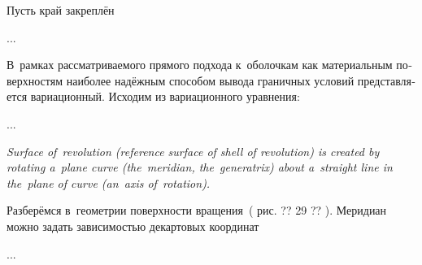 

\begin{otherlanguage}{russian}

Пусть край закреплён

...



\end{otherlanguage}



\begin{otherlanguage}{russian}

В~рамках рассматриваемого прямого подхода к~оболочкам как материальным поверхностям наиболее надёжным способом вывода граничных условий представляется вариационный. Исходим из вариационного уравнения:

...



\end{otherlanguage}



\noindent \emph{Surface of~revolution (reference surface of shell of revolution) is created by rotating a~plane curve (the~meridian, the~generatrix) about a~straight line in the~plane of curve (an~axis of~rotation).}

\begin{otherlanguage}{russian}

Разберёмся в~геометрии поверхности вращения~( рис. ?? 29 ?? ). Меридиан можно задать зависимостью декартовых координат

...



\end{otherlanguage}

